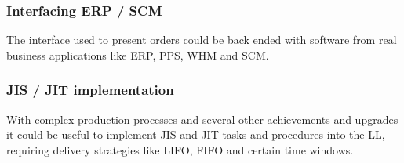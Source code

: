 \documentclass[12pt,twoside]{article}
\begin{document}
\subsubsection{Interfacing ERP / SCM}
The interface used to present orders could be back ended with software
from real business applications like ERP, PPS, WHM and SCM.

\subsubsection{JIS / JIT implementation}
With complex production processes and several other achievements and
upgrades it could be useful to implement JIS and JIT tasks and
procedures into the LL, requiring delivery strategies like LIFO, FIFO
and certain time windows.



 
\end{document}
